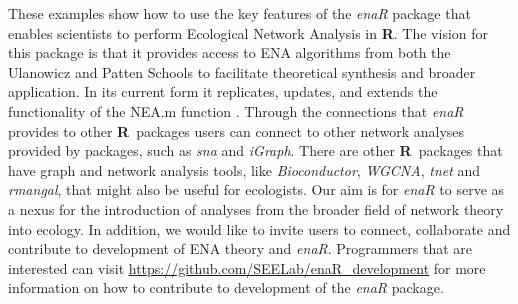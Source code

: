 \documentclass[article]{jss}
\newcommand{\R}{\textbf{R}}
\begin{document}
These examples show how to use the key features of the \textit{enaR}
package that enables scientists to perform Ecological Network Analysis
in \R.  The vision for this package is that it provides access to ENA
algorithms from both the Ulanowicz and Patten Schools to facilitate
theoretical synthesis and broader application.  In its current form it
replicates, updates, and extends the functionality of the NEA.m
function \citep{fath06}.  Through the connections that \textit{enaR}
provides to other \R\ packages users can connect to other network
analyses provided by packages, such as \textit{sna} and
\textit{iGraph}. There are other \R\ packages that have graph and
network analysis tools, like \textit{Bioconductor}, \textit{WGCNA},
\textit{tnet} and \textit{rmangal}, that might also be useful for
ecologists.  Our aim is for \textit{enaR} to serve as a nexus for the
introduction of analyses from the broader field of network theory into
ecology. In addition, we would like to invite users to connect,
collaborate and contribute to development of ENA theory and
\textit{enaR}. Programmers that are interested can visit
\url{https://github.com/SEELab/enaR_development} for more information
on how to contribute to development of the \textit{enaR} package.


\end{document}
